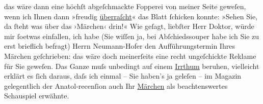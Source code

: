                das wäre dann eine höchſt abgeſchmackte Fopperei \introOben{}von\introOben{} meiner
               Seite geweſen, wenn ich Ihnen dann »freudig \uline{überraſcht}« das Blatt ſchicken konnte: »Sehen Sie, da ſteht was über das
                  ›Märchen‹ drin!« Wie geſagt, liebſter Herr
               Doktor,  würde mir ſoetwas einfallen,
               ich habe  (Sie wiſſen ja, bei {\pb}Abſchiedssouper habe ich Sie zu erst brieflich
               befragt) Herrn Neumann-Hofer den
               Aufführungstermin Ihres Märchen geſchrieben: das
               wäre doch meinerſeits eine recht ungeſchickte Reklame für Sie geweſen. Das Ganze muſs
               unbedingt auf einem \uline{Irrthum} beruhen, vielleicht
               erklärt es ſich daraus, daſs ich einmal – Sie haben’s ja geleſen – im Magazin gelegentlich der Anatol-recenſion auch Ihr \uline{Märchen} als beachtenswertes Schauspiel erwähnte.\pend
           
